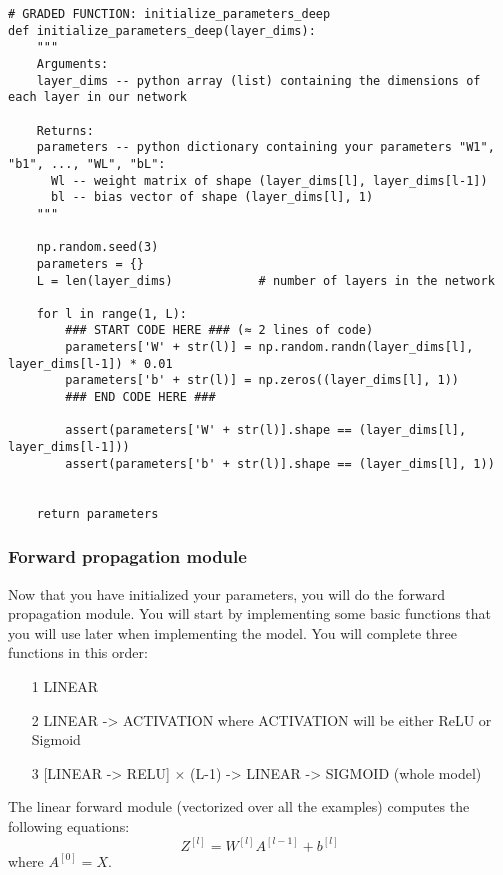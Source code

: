 \begin{verbatim}
# GRADED FUNCTION: initialize_parameters_deep
def initialize_parameters_deep(layer_dims):
    """
    Arguments:
    layer_dims -- python array (list) containing the dimensions of each layer in our network
    
    Returns:
    parameters -- python dictionary containing your parameters "W1", "b1", ..., "WL", "bL":
      Wl -- weight matrix of shape (layer_dims[l], layer_dims[l-1])
      bl -- bias vector of shape (layer_dims[l], 1)
    """
    
    np.random.seed(3)
    parameters = {}
    L = len(layer_dims)            # number of layers in the network

    for l in range(1, L):
        ### START CODE HERE ### (≈ 2 lines of code)
        parameters['W' + str(l)] = np.random.randn(layer_dims[l], layer_dims[l-1]) * 0.01
        parameters['b' + str(l)] = np.zeros((layer_dims[l], 1))
        ### END CODE HERE ###
        
        assert(parameters['W' + str(l)].shape == (layer_dims[l], layer_dims[l-1]))
        assert(parameters['b' + str(l)].shape == (layer_dims[l], 1))

        
    return parameters
\end{verbatim}



\subsubsection{Forward propagation module}

Now that you have initialized your parameters, you will do the forward propagation module. You will start by implementing some basic functions that you will use later when implementing the model. You will complete three functions in this order:
\begin{itemize}
\item[1] LINEAR

\item[2] LINEAR -> ACTIVATION where ACTIVATION will be either ReLU or Sigmoid

\item[3] [LINEAR -> RELU] $\times$ (L-1) -> LINEAR -> SIGMOID (whole model)
\end{itemize}

The linear forward module (vectorized over all the examples) computes the following equations:
\begin{equation}
Z^{[l]} = W^{[l]}A^{[l-1]} +b^{[l]}
\end{equation}
where $A^{[0]} = X$. 

